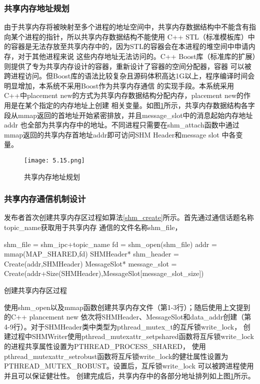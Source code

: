 \subsubsection{共享内存地址规划}
由于共享内存将被映射至多个进程的地址空间中，共享内存数据结构中不能含有指向某个进程的指针，所以共享内存数据结构不能使用
C++ STL（标准模板库）中的容器是无法存放至共享内存中的，因为STL的容器会在本进程的堆空间中申请内存，对于其他进程来说
这些内存地址无法访问的。C++ Boost库（标准库的扩展）则提供了专为共享内存设计的容器，重新设计了容器的空间分配器，容器
可以被跨进程访问。但Boost库的语法比较复杂且源码体积高达1G以上，程序编译时间会明显增加，本系统不采用Boost作为共享内存通信
的实现手段。本系统采用C++中placement new的方式为共享内存数据结构分配内存，placement new的作用是在某个指定的内存地址上创建
相关变量。如图\ref{shm_addr_design}所示，共享内存数据结构各字段从mmap返回的首地址开始紧密排放，并且message\_slot中的消息起始内存地址addr
也全部为共享内存中的地址。不同进程只需要在shm\_attach函数中通过mmap返回的共享内存首地址addr即可访问SHM Header和message slot
中各变量。
\begin{figure}[H]
  \centering
  \texttt{[image: 5.15.png]}
  \caption{共享内存地址规划}
  \label{shm_addr_design}
\end{figure}

\subsubsection{共享内存通信机制设计}
发布者首次创建共享内存区过程如算法\ref{shm_create}所示。首先通过通信话题名称topic\_name获取用于共享内存
通信的文件名称shm\_file，
\begin{algorithm}
  \small
  \SetAlgoLined
  shm\_file = shm\_ipc+topic\_name\;
  fd = shm\_open(shm\_file)\;
  addr = mmap(MAP\_SHARED,fd)\;
  SHMHeader* shm\_header = Create(addr,SHMHeader)\;
  MessageSlot* message\_slot = Create(addr+Size(SHMHeader),MessageSlot[message\_slot\_size])\;
  \caption{创建共享内存区过程}
  \label{shm_create}
\end{algorithm}
使用shm\_open以及mmap函数创建共享内存文件（第1-3行）；随后使用上文提到的C++ plancement new
依次将SHMHeader、MessageSlot和data\_addr创建（第4-9行）。对于SHMHeader类中类型为pthread\_mutex\_t的互斥锁write\_lock，
创建过程中SHMWriter使用pthread\_mutexattr\_setpshared函数将互斥锁write\_lock的进程共享属性设置为PTHREAD\_PROCESS\_SHARED，
使用pthread\_mutexattr\_setrobust函数将互斥锁write\_lock的健壮属性设置为PTHREAD\_MUTEX\_ROBUST。设置后，互斥锁write\_lock
可以被跨进程使用并且可以保证健壮性。
创建完成后，共享内存中的各部分地址排列如上图\ref{shm_addr_design}所示。

